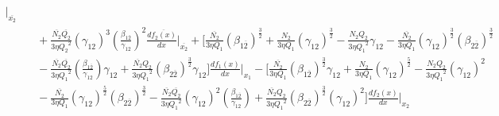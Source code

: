 \documentclass[fleqn, 10pt]{article}
\begin{document}
\begin{equation*}
\begin{split}
\Bigg|_{\overline{x_2}} \\ & \quad +   \frac{\overline{N_2} \overline{Q_2}}{3 \eta {Q_2}^2} (\gamma_{12})^3 \left(\frac{\beta_{1\overline{2}}}{\gamma_{12}}\right)^2 \frac{d\overline{f_2(x)}}{dx} \Bigg|_{\overline{x_2}} + \Biggl[ \frac{\overline{N_2}}{3 \eta Q_1} (\beta_{1\overline{2}})^\frac{3}{2} + \frac{N_2}{3 \eta Q_1} (\gamma_{12})^\frac{3}{2} - \frac{N_2 Q_2}{3 \eta {Q_1}^2} \gamma_{12} - \frac{\overline{N_2}}{3 \eta Q_1} (\gamma_{12})^\frac{3}{2} (\beta_{2\overline{2}})^\frac{3}{2} \\ & \quad - \frac{\overline{N_2} \overline{Q_2}}{3 \eta {Q_1}^2} \left(\frac{\beta_{1\overline{2}}}{\gamma_{12}}\right) \gamma_{12}   + \frac{\overline{N_2} Q_2}{3 \eta {Q_1}^2} (\beta_{2 \overline{2}})^\frac{3}{2} \gamma_{12} \Biggr]   \frac{df_1(x)}{dx} \Bigg|_{x_1} - \Biggl[ \frac{\overline{N_2}}{3 \eta Q_1} (\beta_{1\overline{2}})^\frac{3}{2} \gamma_{12} + \frac{N_2}{3 \eta Q_1} (\gamma_{12})^\frac{5}{2} - \frac{N_2 Q_2}{3 \eta {Q_1}^2} (\gamma_{12})^2 \\ & \quad - \frac{\overline{N_2}}{3 \eta Q_1} (\gamma_{12})^\frac{5}{2} (\beta_{2\overline{2}})^\frac{3}{2}  - \frac{\overline{N_2} \overline{Q_2}}{3 \eta {Q_1}^2} (\gamma_{12})^2 \left(\frac{\beta_{1\overline{2}}}{\gamma_{12}}\right) +   \frac{\overline{N_2} Q_2}{3 \eta {Q_1}^2} (\beta_{2\overline{2}})^\frac{3}{2} (\gamma_{12})^2 \Biggr] \frac{df_2(x)}{dx} \Bigg|_{x_2}
            \end{split}
            \end{equation*}
\end{document}
